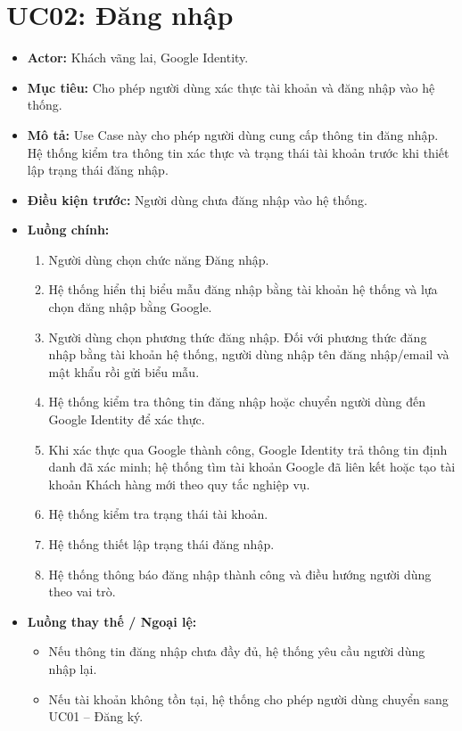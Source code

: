 \section{UC02: Đăng nhập}
\begin{itemize}
    \item \textbf{Actor:} Khách vãng lai, Google Identity.
    \item \textbf{Mục tiêu:} Cho phép người dùng xác thực tài khoản và đăng nhập vào hệ thống.
    \item \textbf{Mô tả:} Use Case này cho phép người dùng cung cấp thông tin đăng nhập. Hệ thống kiểm tra thông tin xác thực và trạng thái tài khoản trước khi thiết lập trạng thái đăng nhập.
    \item \textbf{Điều kiện trước:} Người dùng chưa đăng nhập vào hệ thống.
    \item \textbf{Luồng chính:}
    \begin{enumerate}
        \item Người dùng chọn chức năng Đăng nhập.
        \item Hệ thống hiển thị biểu mẫu đăng nhập bằng tài khoản hệ thống và lựa chọn đăng nhập bằng Google.
        \item Người dùng chọn phương thức đăng nhập. Đối với phương thức đăng nhập bằng tài khoản hệ thống, người dùng nhập tên đăng nhập/email và mật khẩu rồi gửi biểu mẫu.
        \item Hệ thống kiểm tra thông tin đăng nhập hoặc chuyển người dùng đến Google Identity để xác thực.
        \item Khi xác thực qua Google thành công, Google Identity trả thông tin định danh đã xác minh; hệ thống tìm tài khoản Google đã liên kết hoặc tạo tài khoản Khách hàng mới theo quy tắc nghiệp vụ.
        \item Hệ thống kiểm tra trạng thái tài khoản.
        \item Hệ thống thiết lập trạng thái đăng nhập.
        \item Hệ thống thông báo đăng nhập thành công và điều hướng người dùng theo vai trò.
    \end{enumerate}
    \item \textbf{Luồng thay thế / Ngoại lệ:}
    \begin{itemize}
        \item Nếu thông tin đăng nhập chưa đầy đủ, hệ thống yêu cầu người dùng nhập lại.
        \item Nếu tài khoản không tồn tại, hệ thống cho phép người dùng chuyển sang UC01 -- Đăng ký.

\end{itemize}
\end{itemize}
